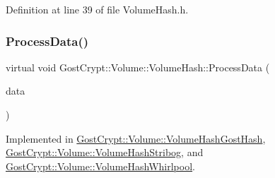 Definition at line 39 of file Volume\+Hash.\+h.

\mbox{\label{class_gost_crypt_1_1_volume_1_1_volume_hash_a58c69a4ea5a247454bd6b4dd6c736ecd}} 
\subsubsection{\texorpdfstring{Process\+Data()}{ProcessData()}}
{\footnotesize\ttfamily virtual void Gost\+Crypt\+::\+Volume\+::\+Volume\+Hash\+::\+Process\+Data (\begin{DoxyParamCaption}\item[{const \hyperlink{class_gost_crypt_1_1_buffer_ptr}{Buffer\+Ptr} \&}]{data }\end{DoxyParamCaption})\hspace{0.3cm}{\ttfamily [pure virtual]}}



Implemented in \hyperlink{class_gost_crypt_1_1_volume_1_1_volume_hash_gost_hash_aa4e7b1f157512edc4fc184ffd5d15c27}{Gost\+Crypt\+::\+Volume\+::\+Volume\+Hash\+Gost\+Hash}, \hyperlink{class_gost_crypt_1_1_volume_1_1_volume_hash_stribog_ab3da67dc6f8ae8b092c089e5f174876e}{Gost\+Crypt\+::\+Volume\+::\+Volume\+Hash\+Stribog}, and \hyperlink{class_gost_crypt_1_1_volume_1_1_volume_hash_whirlpool_ae83645382a261787b78f43c4bfc1ed16}{Gost\+Crypt\+::\+Volume\+::\+Volume\+Hash\+Whirlpool}.

\mbox{\label{class_gost_crypt_1_1_volume_1_1_volume_hash_ade18ec915b02edf8d0ab909ab6858330}} 
